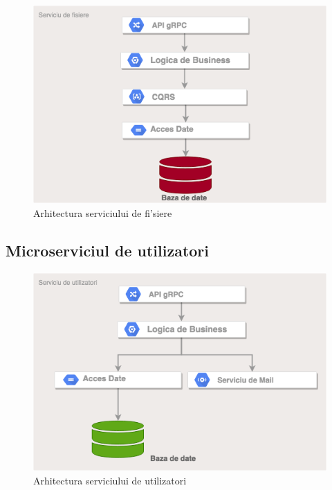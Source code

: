 \documentclass[12pt,a4paper,twoside]{report}
\begin{document}
\begin{figure}[H]
\begin{center}
\advance\leftskip-3cm
\advance\rightskip-3cm
\includegraphics[keepaspectratio=true,scale=0.55]{img/file_arch.png}
\caption{Arhitectura serviciului de fi'siere}
\label{file_arch}
\end{center}
\end{figure}


\subsection{Microserviciul de utilizatori}  \label{s_user}

\begin{figure}[H]
\begin{center}
\advance\leftskip-3cm
\advance\rightskip-3cm
\includegraphics[keepaspectratio=true,scale=0.55]{img/user_arch.png}
\caption{Arhitectura serviciului de utilizatori}
\label{user_arch}
\end{center}
\end{figure}
\end{document}
